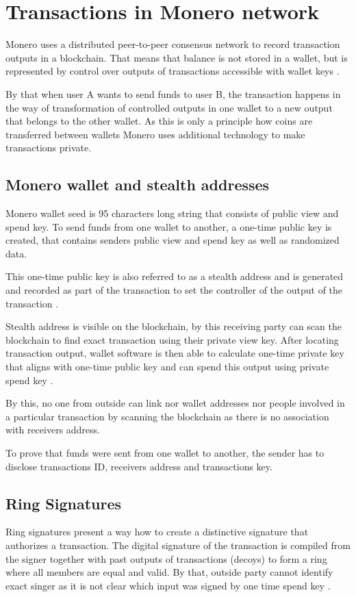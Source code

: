 \documentclass[
  printed, %
  table,   %
  nolof,     %
  nolot,     %
           oneside, color
]{fithesis3}
\begin{document}
\section{Transactions in Monero network}
Monero uses a distributed peer-to-peer consensus network to record transaction outputs in a blockchain. That means that balance is not stored in a wallet, but is represented by control over outputs of transactions accessible with wallet keys \cite{seguias2018moneroa}.

By that when user A wants to send funds to user B, the transaction happens in the way of transformation of controlled outputs in one wallet to a new output that belongs to the other wallet. As this is only a principle how coins are transferred between wallets Monero uses additional technology to make transactions private.
\subsection{Monero wallet and stealth addresses}
\label{sec:stealthaddresses}
Monero wallet seed is 95 characters long string that consists of public view and spend key. To send funds from one wallet to another, a one-time public key is created, that contains senders public view and spend key as well as randomized data. 

This one-time public key is also referred to as a stealth address and is generated and recorded as part of the transaction to set the controller of the output of the transaction \cite{seguias2018monero}.

Stealth address is visible on the blockchain, by this receiving party can scan the blockchain to find exact transaction using their private view key. After locating transaction output, wallet software is then able to calculate one-time private key that aligns with one-time public key and can spend this output using private spend key \cite{courtois2017stealth}.

By this, no one from outside can link nor wallet addresses nor people involved in a particular transaction by scanning the blockchain as there is no association with receivers address.

To prove that funds were sent from one wallet to another, the sender has to disclose transactions ID, receivers address and transactions key.

\subsection{Ring Signatures}
\label{sec:ringsignatures}
Ring signatures present a way how to create a distinctive signature that authorizes a transaction. The digital signature of the transaction is compiled from the signer together with past outputs of transactions (decoys) to form a ring where all members are equal and valid. By that, outside party cannot identify exact singer as it is not clear which input was signed by one time spend key \cite{mercer2016privacy}.
\end{document}
